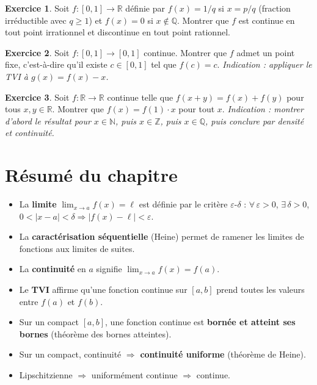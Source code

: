 \documentclass[12pt,a4paper,openany]{book}
\theoremstyle{definition}
\newtheorem{exercice}{Exercice}[chapter]
\newcommand{\N}{\mathbb{N}}
\newcommand{\Z}{\mathbb{Z}}
\newcommand{\Q}{\mathbb{Q}}
\newcommand{\R}{\mathbb{R}}
\begin{document}
\begin{exercice}\label{exo:thomae}
Soit $f \colon [0, 1] \to \R$ définie par $f(x) = 1/q$ si $x = p/q$ (fraction irréductible avec $q \geqslant 1$) et $f(x) = 0$ si $x \notin \Q$. Montrer que $f$ est continue en tout point irrationnel et discontinue en tout point rationnel.
\end{exercice}

\begin{exercice}\label{exo:point-fixe}
Soit $f \colon [0, 1] \to [0, 1]$ continue. Montrer que $f$ admet un point fixe, c'est-à-dire qu'il existe $c \in [0, 1]$ tel que $f(c) = c$. \textit{Indication : appliquer le TVI à $g(x) = f(x) - x$.}
\end{exercice}

\begin{exercice}\label{exo:cauchy-fonctionnel}
Soit $f \colon \R \to \R$ continue telle que $f(x+y) = f(x) + f(y)$ pour tous $x, y \in \R$. Montrer que $f(x) = f(1)\cdot x$ pour tout $x$.
\textit{Indication : montrer d'abord le résultat pour $x \in \N$, puis $x \in \Z$, puis $x \in \Q$, puis conclure par densité et continuité.}
\end{exercice}

\section*{Résumé du chapitre~\thechapter}

\begin{itemize}
  \item La \textbf{limite} $\lim_{x \to a} f(x) = \ell$ est définie par le critère $\varepsilon$-$\delta$ : $\forall\,\varepsilon > 0$, $\exists\,\delta > 0$, $0 < |x-a| < \delta \Rightarrow |f(x) - \ell| < \varepsilon$.
  \item La \textbf{caractérisation séquentielle} (Heine) permet de ramener les limites de fonctions aux limites de suites.
  \item La \textbf{continuité} en $a$ signifie $\lim_{x \to a} f(x) = f(a)$.
  \item Le \textbf{TVI} affirme qu'une fonction continue sur $[a, b]$ prend toutes les valeurs entre $f(a)$ et $f(b)$.
  \item Sur un compact $[a, b]$, une fonction continue est \textbf{bornée et atteint ses bornes} (théorème des bornes atteintes).
  \item Sur un compact, continuité $\Rightarrow$ \textbf{continuité uniforme} (théorème de Heine).
  \item Lipschitzienne $\Rightarrow$ uniformément continue $\Rightarrow$ continue.
\end{itemize}
\end{document}
